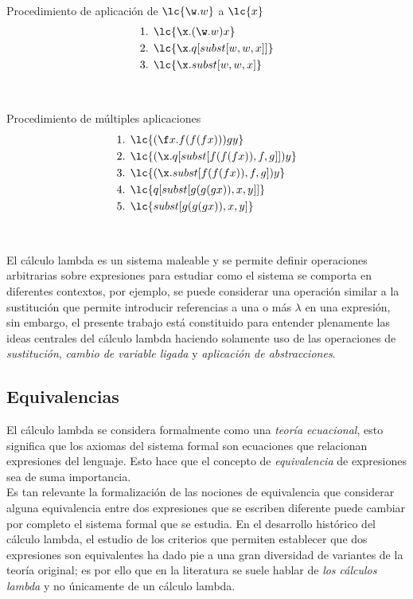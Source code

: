 \begin{ejemplo} Procedimiento de aplicación de \(\lc{\w.w}\) a \(\lc{x}\)
  \label{ejemplo:aplicacion4}
  \begin{align*}
    \text{1. } &\lc{\x.(\w.w)x} \\
    \text{2. } &\lc{\x.q[subst[w,w,x]]} \\
    \text{3. } &\lc{\x.subst[w,w,x]}
  \end{align*}
\end{ejemplo} \

\begin{ejemplo} Procedimiento de múltiples aplicaciones
  \label{ejemplo:aplicacion5}
  \begin{align*}
    \text{1. } &\lc{(\f x.f(f(f x)))g y} \\
    \text{2. } &\lc{(\x.q[subst[f(f(f x)), f, g]]) y} \\
    \text{3. } &\lc{(\x.subst[f(f(f x)), f, g]) y} \\
    \text{4. } &\lc{q[subst[g(g(g x)), x, y]]} \\
    \text{5. } &\lc{subst[g(g(g x)), x, y]}
  \end{align*}
\end{ejemplo} \

El cálculo lambda es un sistema maleable y se permite definir operaciones arbitrarias sobre expresiones para estudiar como el sistema se comporta en diferentes contextos, por ejemplo, se puede considerar una operación similar a la sustitución que permite introducir referencias a una o más \(\lambda\) en una expresión, sin embargo, el presente trabajo está constituido para entender plenamente las ideas centrales del cálculo lambda haciendo solamente uso de las operaciones de \emph{sustitución}, \emph{cambio de variable ligada} y \emph{aplicación de abstracciones}. \\

\subsection{Equivalencias}

El cálculo lambda se considera formalmente como una \emph{teoría ecuacional}, esto significa que los axiomas del sistema formal son ecuaciones que relacionan expresiones del lenguaje. Esto hace que el concepto de \emph{equivalencia} de expresiones sea de suma importancia. \\

Es tan relevante la formalización de las nociones de equivalencia que considerar alguna equivalencia entre dos expresiones que se escriben diferente puede cambiar por completo el sistema formal que se estudia. En el desarrollo histórico del cálculo lambda, el estudio de los criterios que permiten establecer que dos expresiones son equivalentes ha dado pie a una gran diversidad de variantes de la teoría original; es por ello que en la literatura se suele hablar de \emph{los cálculos lambda} y no únicamente de un cálculo lambda. \\

